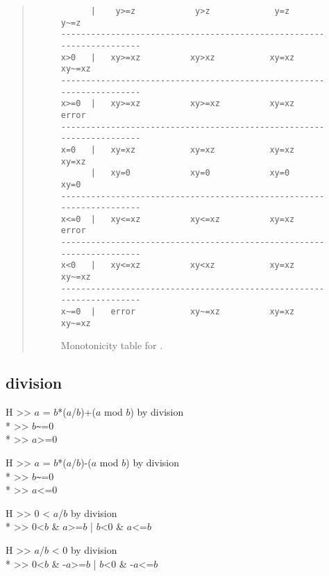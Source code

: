 \begin{quote}
\begin{figure}
\begin{verbatim}
      |    y>=z            y>z             y=z             y~=z
---------------------------------------------------------------------
x>0   |   xy>=xz          xy>xz           xy=xz           xy~=xz
---------------------------------------------------------------------
x>=0  |   xy>=xz          xy>=xz          xy=xz           error
---------------------------------------------------------------------
x=0   |   xy=xz           xy=xz           xy=xz           xy=xz
      |   xy=0            xy=0            xy=0            xy=0
---------------------------------------------------------------------
x<=0  |   xy<=xz          xy<=xz          xy=xz           error
---------------------------------------------------------------------
x<0   |   xy<=xz          xy<xz           xy=xz           xy~=xz
---------------------------------------------------------------------
x~=0  |   error           xy~=xz          xy=xz           xy~=xz
\end{verbatim}
\caption{\protect Monotonicity table for {\tt *}. \label{mult-table}}
\end{figure}


\end{quote}

\subsection*{division}

\goalgroup   H >> $a$ = $b$*($a$/$b$)+($a$ mod $b$)   by division\\*
\subgoal      >> $b$\verb`~`=0\\*
\subgoal      >> $a$>=0

\goalskip

\goal  H >> $a$ = $b$*($a$/$b$)-($a$ mod $b$)   by division\\*
\subgoal      >> $b$\verb`~`=0\\*
\subgoal      >> $a$<=0
 
\goalskip

\goal  H >> 0 < $a$/$b$   by division\\*
\subgoal      >> 0<$b$ \& $a$>=$b$ | $b$<0 \& $a$<=$b$

\goalskip

\goal  H >> $a$/$b$ < 0   by division\\*
\subgoal      >> 0<$b$ \& -$a$>=$b$ | $b$<0 \& -$a$<=$b$

\goalskip


